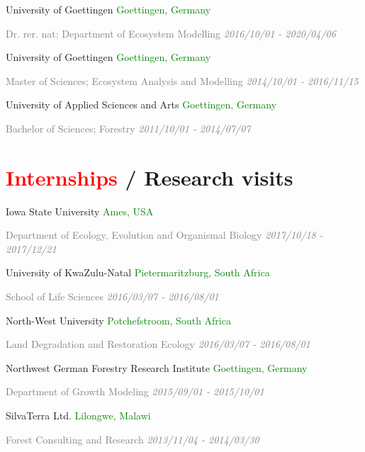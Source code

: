 \documentclass[hidelinks]{report}
\begin{document}
University of Goettingen
\hfill
\textcolor{green}{Goettingen, Germany}

\textcolor{grey}{\footnotesize{Dr. rer. nat; Department of Ecosystem Modelling}}
\hfill
\textcolor{grey}{\textit{2016/10/01 - 2020/04/06}}

University of Goettingen
\hfill
\textcolor{green}{Goettingen, Germany}

\textcolor{grey}{\footnotesize{Master of Sciences; Ecosystem Analysis and Modelling}}
\hfill
\textcolor{grey}{\textit{2014/10/01 - 2016/11/15}}

University of Applied Sciences and Arts
\hfill
\textcolor{green}{Goettingen, Germany}

\textcolor{grey}{\footnotesize{Bachelor of Sciences; Forestry}}
\hfill
\textcolor{grey}{\textit{2011/10/01 - 2014/07/07}}


\section*{\textcolor{red}{Internships} / Research visits \sout{\hfill}}

Iowa State University
\hfill
\textcolor{green}{Ames, USA}

\textcolor{grey}{\footnotesize{Department of Ecology, Evolution and Organismal Biology}}
\hfill
\textcolor{grey}{\textit{2017/10/18 - 2017/12/21}}

University of KwaZulu-Natal
\hfill
\textcolor{green}{Pietermaritzburg, South Africa}

\textcolor{grey}{\footnotesize{School of Life Sciences}}
\hfill
\textcolor{grey}{\textit{2016/03/07 - 2016/08/01}}

North-West University
\hfill
\textcolor{green}{Potchefstroom, South Africa}

\textcolor{grey}{\footnotesize{Land Degradation and Restoration Ecology}}
\hfill
\textcolor{grey}{\textit{2016/03/07 - 2016/08/01}}

Northwest German Forestry Research Institute
\hfill
\textcolor{green}{Goettingen, Germany}

\textcolor{grey}{\footnotesize{Department of Growth Modeling}}
\hfill
\textcolor{grey}{\textit{2015/09/01 - 2015/10/01}}

SilvaTerra Ltd.
\hfill
\textcolor{green}{Lilongwe, Malawi}

\textcolor{grey}{\footnotesize{Forest Consulting and Research}}
\hfill
\textcolor{grey}{\textit{2013/11/04 - 2014/03/30}}
\end{document}
